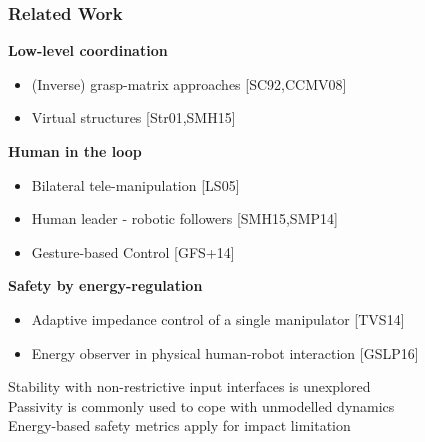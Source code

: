 \documentclass[student]{ITRslides}
\begin{document}
\begin{frame}
	\frametitle{Related Work}
	\textbf{Low-level coordination}
	\begin{itemize}
		\item (Inverse) grasp-matrix approaches \nocite{Schneider_92,Caccavale_08} {\tiny [SC92,CCMV08]} 	
		\item Virtual structures \nocite{Stramigioli_01, Sieber_15} {\tiny [Str01,SMH15]} 
	\end{itemize}
	\textbf{Human in the loop}
	\begin{itemize}	
		\item Bilateral tele-manipulation  \nocite{Lee_05} {\tiny [LS05]} 	
		\item Human leader - robotic followers \nocite{Sieber_15, Scheggi_14}{\tiny [SMH15,SMP14]} 
		\item Gesture-based Control \nocite{Gioioso_2014}{\tiny [GFS+14]} 
	\end{itemize}
	\textbf{Safety by energy-regulation}
	\begin{itemize}
		\item Adaptive impedance control of a single manipulator \nocite{Tadele_14}{\tiny [TVS14]}
		\item Energy observer in physical human-robot interaction \nocite{Geravand_16}{\tiny [GSLP16]}
	\end{itemize}
		
			\begin{block}{}

\hspace*{1mm} Stability with non-restrictive input interfaces is unexplored \\
 \hspace*{1mm} Passivity is commonly used to cope with unmodelled dynamics \\
 \hspace*{1mm} Energy-based safety metrics apply for impact limitation 

			\end{block}
\end{frame}
\end{document}
